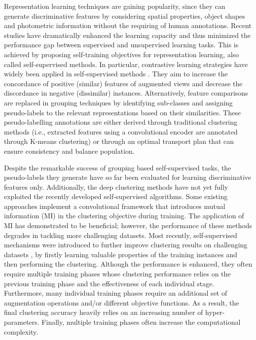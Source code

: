 \documentclass[journal]{IEEEtran}
\begin{document}
Representation learning techniques are gaining popularity, since they can generate discriminative features by considering spatial properties, object shapes and photometric information without the requiring of human annotations. Recent studies \cite{caron2020unsupervised,pmlr-v119-chen20j,He_2020_CVPR,2018arXiv180703748V} have dramatically enhanced the learning capacity and thus minimized the performance gap between supervised and unsupervised learning tasks. This is achieved by proposing self-training objectives for representation learning, also called self-supervised methods.
In particular, contrastive learning strategies have widely been applied in self-supervised methods \cite{ caron2020unsupervised,pmlr-v119-chen20j,pmlr-v9-gutmann10a,2018arXiv180703748V}. They aim to increase the concordance of positive (similar) features of augmented views and decrease the discordance in negative (dissimilar) instances. Alternatively, feature comparisons are replaced in grouping techniques \cite{asano2020self, caron2018deep,caron2020unsupervised} by identifying sub-classes and assigning pseudo-labels to the relevant representations based on their similarities. These pseudo-labelling annotations are either derived through traditional clustering methods \cite{caron2018deep} (i.e., extracted features using a convolutional encoder are annotated through K-means clustering) or through an optimal transport plan \cite{asano2020self,caron2020unsupervised} that can ensure consistency and balance population. 
\par

Despite the remarkable success of grouping based self-supervised tasks, the pseudo-labels they generate have so far been evaluated for learning discriminative features only. Additionally, the deep clustering methods have not yet fully exploited the recently developed self-supervised algorithms. Some existing approaches \cite{Hu2017,Ji_2019_ICCV} implement a convolutional framework that introduces mutual information (MI) in the clustering objective during training. The application of MI has demonstrated to be beneficial; however, the performance of these methods degrades in tackling more challenging datasets. Most recently, self-supervised mechanisms were introduced to further improve clustering results on challenging datasets \cite{DBLP:conf/eccv/HanPPKC20,vangansbeke2020scan}, by firstly learning valuable properties of the training instances and then performing the clustering. Although the performance is enhanced, they often require multiple training phases whose clustering performance relies on the previous training phase and the effectiveness of each individual stage. Furthermore, many individual training phases require an additional set of augmentation operations and/or different objective functions. As a result, the final clustering accuracy heavily relies on an increasing number of hyper-parameters. Finally, multiple training phases often increase the computational complexity. 
\end{document}
